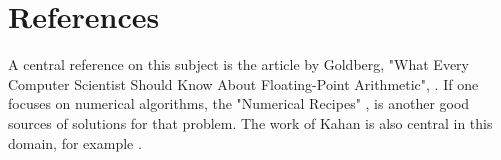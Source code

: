 \section{References}

A central reference on this subject is the article 
by Goldberg, "What Every Computer Scientist Should Know About Floating-Point Arithmetic", 
\cite{WhatEveryComputerScientist}.
If one focuses on numerical algorithms, the "Numerical Recipes" \cite{NumericalRecipes},
is another good sources of solutions for that problem.
The work of Kahan is also central in this domain, for example \cite{Kahan2004}.


